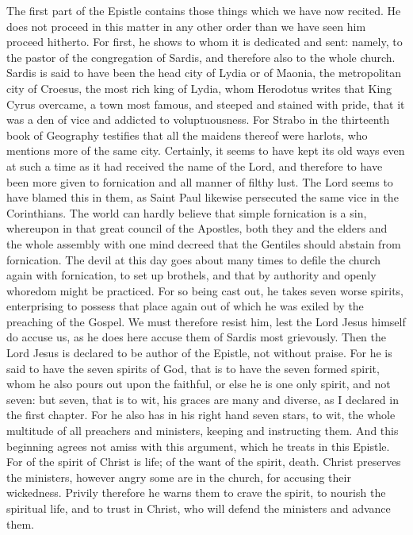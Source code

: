 The first part of the Epistle contains those things which we have now recited. He does not proceed in this matter in any other order than we have seen him proceed hitherto. For first, he shows to whom it is dedicated and sent: namely, to the pastor of the congregation of Sardis, and therefore also to the whole church. Sardis is said to have been the head city of Lydia or of Maonia, the metropolitan city of Croesus, the most rich king of Lydia, whom Herodotus writes that King Cyrus overcame, a town most famous, and steeped and stained with pride, that it was a den of vice and addicted to voluptuousness. For Strabo in the thirteenth book of Geography testifies that all the maidens thereof were harlots, who mentions more of the same city. Certainly, it seems to have kept its old ways even at such a time as it had received the name of the Lord, and therefore to have been more given to fornication and all manner of filthy lust. The Lord seems to have blamed this in them, as Saint Paul likewise persecuted the same vice in the Corinthians. The world can hardly believe that simple fornication is a sin, whereupon in that great council of the Apostles, both they and the elders and the whole assembly with one mind decreed that the Gentiles should abstain from fornication. The devil at this day goes about many times to defile the church again with fornication, to set up brothels, and that by authority and openly whoredom might be practiced. For so being cast out, he takes seven worse spirits, enterprising to possess that place again out of which he was exiled by the preaching of the Gospel. We must therefore resist him, lest the Lord Jesus himself do accuse us, as he does here accuse them of Sardis most grievously. Then the Lord Jesus is declared to be author of the Epistle, not without praise. For he is said to have the seven spirits of God, that is to have the seven formed spirit, whom he also pours out upon the faithful, or else he is one only spirit, and not seven: but seven, that is to wit, his graces are many and diverse, as I declared in the first chapter. For he also has in his right hand seven stars, to wit, the whole multitude of all preachers and ministers, keeping and instructing them. And this beginning agrees not amiss with this argument, which he treats in this Epistle. For of the spirit of Christ is life; of the want of the spirit, death. Christ preserves the ministers, however angry some are in the church, for accusing their wickedness. Privily therefore he warns them to crave the spirit, to nourish the spiritual life, and to trust in Christ, who will defend the ministers and advance them.

